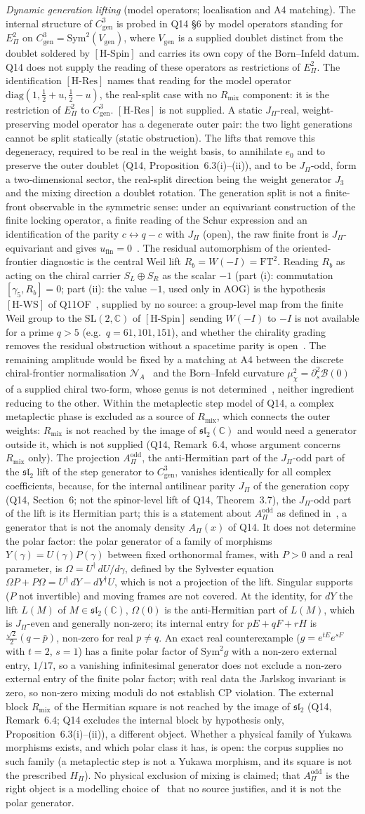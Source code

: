 \documentclass[11pt,a4paper]{article}
\theoremstyle{definition}
\newcommand{\SL}{\mathrm{SL}}
\newcommand{\Epi}{E_\Pi}
\newcommand{\Cgen}{C^3_{\mathrm{gen}}}
\newcommand{\HSpin}{\ensuremath{[\mathrm{H\text{-}Spin}]}}
\newcommand{\HRes}{\ensuremath{[\mathrm{H\text{-}Res}]}}
\newcommand{\HWS}{\ensuremath{[\mathrm{H\text{-}WS}]}}
\newcommand{\AOdd}{A_\Pi^{\mathrm{odd}}}
\newcommand{\AClause}{%
  The projection $\AOdd$, the anti-Hermitian part of the $J_\Pi$-odd part of the $\mathfrak{sl}_2$ lift of the step
  generator to $\Cgen$, vanishes identically for all complex coefficients, because, for the internal antilinear
  parity $J_\Pi$ of the generation copy (Q14, Section~6; not the spinor-level lift of Q14, Theorem~3.7), the
  $J_\Pi$-odd part of the lift is its Hermitian part; this is a statement about $\AOdd$ as defined
  in~\cite{Beau2026pyo}, a generator that is not the anomaly density $A_\Pi(x)$ of Q14.
  It does not determine the polar factor: the polar generator of a family of morphisms $Y(\gamma)=U(\gamma)P(\gamma)$
  between fixed orthonormal frames, with $P>0$ and a real parameter, is $\Omega=U^\dagger\,dU/d\gamma$, defined by the
  Sylvester equation $\Omega P+P\Omega=U^\dagger\,dY-dY^\dagger U$, which is not a projection of the lift.
  Singular supports ($P$ not invertible) and moving frames are not covered.
  At the identity, for $dY$ the lift $L(M)$ of $M\in\mathfrak{sl}_2(\mathbb{C})$, $\Omega(0)$ is the anti-Hermitian part
  of $L(M)$, which is $J_\Pi$-even and generally non-zero; its internal entry for $pE+qF+rH$ is
  $\tfrac{\sqrt2}{2}(q-\bar p)$, non-zero for real $p\neq q$.
  An exact real counterexample ($g=e^{tE}e^{sF}$ with $t=2$, $s=1$) has a finite polar factor of $\mathrm{Sym}^2 g$
  with a non-zero external entry, $1/17$, so a vanishing infinitesimal generator does not exclude a non-zero
  external entry of the finite polar factor; with real data the Jarlskog invariant is zero, so non-zero mixing
  moduli do not establish CP violation.
  The external block $R_{\mathrm{mix}}$ of the Hermitian square is not reached by the image of $\mathfrak{sl}_2$ (Q14,
  Remark~6.4; Q14 excludes the internal block by hypothesis only, Proposition~6.3(i)--(ii)), a different object.
  Whether a physical family of Yukawa morphisms exists, and which polar class it has, is open: the corpus supplies
  no such family (a metaplectic step is not a Yukawa morphism, and its square is not the prescribed $H_\Pi$).
  No physical exclusion of mixing is claimed; that $\AOdd$ is the right object is a modelling choice
  of~\cite{Beau2026pyo} that no source justifies, and it is not the polar generator.%
}
\begin{document}
      \textit{Dynamic generation lifting} (model operators; localisation and A4 matching).
      The internal structure of $\Cgen$ is probed in Q14 \S6 by model operators standing for $\Epi^2$ on
      $\Cgen = \mathrm{Sym}^2(V_{\mathrm{gen}})$, where $V_{\mathrm{gen}}$ is a supplied doublet distinct from the
      doublet soldered by \HSpin{} and carries its own copy of the Born--Infeld datum.
      Q14 does not supply the reading of these operators as restrictions of $\Epi^2$.
      The identification \HRes{} names that reading for the model operator $\mathrm{diag}(1,\tfrac12+u,\tfrac12-u)$,
      the real-split case with no $R_{\mathrm{mix}}$ component: it is the restriction of $\Epi^2$ to $\Cgen$.
      \HRes{} is not supplied.
      A static $J_\Pi$-real, weight-preserving model operator has a degenerate outer pair:
      the two light generations cannot be split statically (static obstruction).
      The lifts that remove this degeneracy, required to be real in the weight basis, to annihilate $e_0$ and to
      preserve the outer doublet (Q14, Proposition~6.3(i)--(ii)), and to be $J_\Pi$-odd, form a two-dimensional
      sector, the real-split direction being the weight generator $J_3$ and the mixing direction a doublet
      rotation.
      The generation split is not a finite-front observable in the symmetric sense: under an equivariant construction of
      the finite locking operator, a finite reading of the Schur expression and an identification of the parity
      $c\leftrightarrow q-c$ with $J_\Pi$ (open), the raw finite front is $J_\Pi$-equivariant and gives
      $u_{\mathrm{fin}}=0$~\cite{Beau2026prs}.
      The residual automorphism of the oriented-frontier diagnostic is the central Weil lift
      $R_b=W(-I)=\mathrm{FT}^2$.
      Reading $R_b$ as acting on the chiral carrier $S_L\oplus S_R$ as the scalar $-1$ (part (i): commutation
      $[\gamma_5,R_b]=0$; part (ii): the value $-1$, used only in AOG) is the hypothesis \HWS{} of
      Q11OF~\cite{Beau2026q11of}, supplied by no source: a group-level map from the finite Weil
      group to the $\SL(2,\mathbb{C})$ of \HSpin{} sending $W(-I)$ to $-I$ is not available for a prime $q>5$ (e.g.\
      $q=61,101,151$), and whether the chirality
      grading removes the residual obstruction without a spacetime parity is open~\cite{Beau2026q14}.
      The remaining amplitude would be fixed by a matching at A4 between the discrete chiral-frontier normalisation
      $\mathcal N_A$~\cite{Beau2026aar} and the Born--Infeld curvature $\mu_\chi^2=\partial_s^2\mathcal B(0)$ of a
      supplied chiral two-form, whose genus is not determined~\cite{Beau2026bim}, neither ingredient reducing to the
      other.
      Within the metaplectic step model of Q14, a complex metaplectic phase is excluded as a source of
      $R_{\mathrm{mix}}$, which connects the outer weights: $R_{\mathrm{mix}}$ is not reached by the image of
      $\mathfrak{sl}_2(\mathbb{C})$ and would need a generator outside it, which is not supplied (Q14, Remark~6.4,
      whose argument concerns $R_{\mathrm{mix}}$ only).
      \AClause{}
\end{document}
